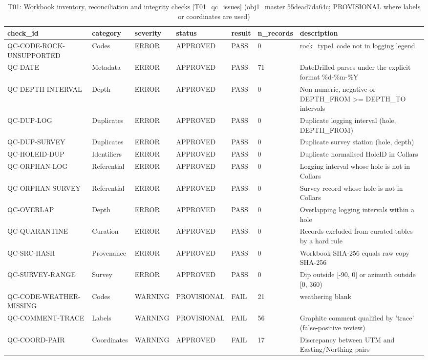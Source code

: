\begin{table}[htbp]
\centering
\caption{T01: Workbook inventory, reconciliation and integrity checks [T01\_qc\_issues] (obj1\_master 55dead7da64c; PROVISIONAL where labels or coordinates are used)}
\begin{tabular}{lllllll}
\toprule
check\_id & category & severity & status & result & n\_records & description \\
\midrule
QC-CODE-ROCK-UNSUPPORTED & Codes & ERROR & APPROVED & PASS & 0 & rock\_type1 code not in logging legend \\
QC-DATE & Metadata & ERROR & APPROVED & PASS & 71 & DateDrilled parses under the explicit format \%d-\%m-\%Y \\
QC-DEPTH-INTERVAL & Depth & ERROR & APPROVED & PASS & 0 & Non-numeric, negative or DEPTH\_FROM >= DEPTH\_TO intervals \\
QC-DUP-LOG & Duplicates & ERROR & APPROVED & PASS & 0 & Duplicate logging interval (hole, DEPTH\_FROM) \\
QC-DUP-SURVEY & Duplicates & ERROR & APPROVED & PASS & 0 & Duplicate survey station (hole, depth) \\
QC-HOLEID-DUP & Identifiers & ERROR & APPROVED & PASS & 0 & Duplicate normalised HoleID in Collars \\
QC-ORPHAN-LOG & Referential & ERROR & APPROVED & PASS & 0 & Logging interval whose hole is not in Collars \\
QC-ORPHAN-SURVEY & Referential & ERROR & APPROVED & PASS & 0 & Survey record whose hole is not in Collars \\
QC-OVERLAP & Depth & ERROR & APPROVED & PASS & 0 & Overlapping logging intervals within a hole \\
QC-QUARANTINE & Curation & ERROR & APPROVED & PASS & 0 & Records excluded from curated tables by a hard rule \\
QC-SRC-HASH & Provenance & ERROR & APPROVED & PASS & 0 & Workbook SHA-256 equals raw copy SHA-256 \\
QC-SURVEY-RANGE & Survey & ERROR & APPROVED & PASS & 0 & Dip outside [-90, 0] or azimuth outside [0, 360) \\
QC-CODE-WEATHER-MISSING & Codes & WARNING & PROVISIONAL & FAIL & 21 & weathering blank \\
QC-COMMENT-TRACE & Labels & WARNING & PROVISIONAL & FAIL & 56 & Graphite comment qualified by 'trace' (false-positive review) \\
QC-COORD-PAIR & Coordinates & WARNING & APPROVED & FAIL & 17 & Discrepancy between UTM and Easting/Northing pairs \\

\end{tabular}
\end{table}
